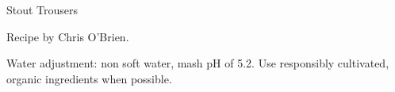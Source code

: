 \begin{recipe}{Stout Trousers}

\begin{aboutblock}
Recipe by Chris O'Brien. 
\end{aboutblock}


\begin{methodandtiming}
 
\begin{mashsteps}
\end{mashsteps}

\begin{fermentationsteps}
\end{fermentationsteps}

\begin{directions}
Water adjustment: non soft water, mash pH of 5.2. Use responsibly cultivated,
organic ingredients when possible.
\end{directions}

\end{methodandtiming}

\recipebreak

\begin{ingredientsblock}

\begin{malts}
\end{malts}

\begin{hops}
\end{hops}


\end{ingredientsblock}

\end{recipe}


